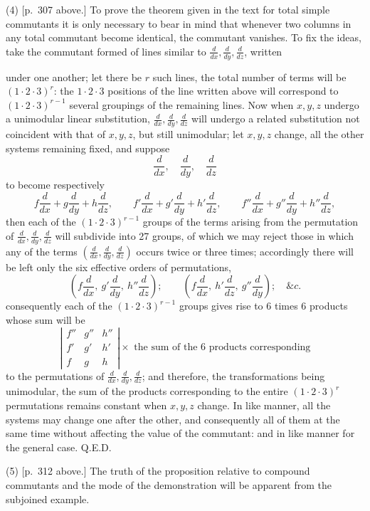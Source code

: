 \documentclass[11pt]{article}
\newcommand{\sourcepage}[1]{\marginpar{\scriptsize p.~#1}}
\begin{document}
(4) [p.~307 above.] To prove the theorem given in the text for total simple commutants it is only necessary to bear in mind that whenever two columns in any total commutant become identical, the commutant vanishes. To fix the ideas, take the commutant formed of lines similar to $\frac{d}{dx},\frac{d}{dy},\frac{d}{dz}$, written

\sourcepage{324}
under one another; let there be $r$ such lines, the total number of terms will be $(1\cdot2\cdot3)^r$: the $1\cdot2\cdot3$ positions of the line written above will correspond to $(1\cdot2\cdot3)^{r-1}$ several groupings of the remaining lines. Now when $x,y,z$ undergo a unimodular linear substitution, $\frac{d}{dx},\frac{d}{dy},\frac{d}{dz}$ will undergo a related substitution not coincident with that of $x,y,z$, but still unimodular; let $x,y,z$ change, all the other systems remaining fixed, and suppose
\[
\frac{d}{dx},\quad\frac{d}{dy},\quad\frac{d}{dz}
\]
to become respectively
\[
f\frac{d}{dx}+g\frac{d}{dy}+h\frac{d}{dz},\qquad
f'\frac{d}{dx}+g'\frac{d}{dy}+h'\frac{d}{dz},\qquad
f''\frac{d}{dx}+g''\frac{d}{dy}+h''\frac{d}{dz},
\]
then each of the $(1\cdot2\cdot3)^{r-1}$ groups of the terms arising from the permutation of $\frac{d}{dx},\frac{d}{dy},\frac{d}{dz}$ will subdivide into 27 groups, of which we may reject those in which any of the terms $\left(\frac{d}{dx},\frac{d}{dy},\frac{d}{dz}\right)$ occurs twice or three times; accordingly there will be left only the six effective orders of permutations,
\[
\left(f\frac{d}{dx},\ g'\frac{d}{dy},\ h''\frac{d}{dz}\right);\qquad
\left(f\frac{d}{dx},\ h'\frac{d}{dz},\ g''\frac{d}{dy}\right);\quad \&c.
\]
consequently each of the $(1\cdot2\cdot3)^{r-1}$ groups gives rise to 6 times 6 products whose sum will be
\[
\left|\begin{array}{ccc}
f''&g''&h''\\
f'&g'&h'\\
f&g&h
\end{array}\right|
\times \text{ the sum of the 6 products corresponding}
\]
to the permutations of $\frac{d}{dx},\frac{d}{dy},\frac{d}{dz}$; and therefore, the transformations being unimodular, the sum of the products corresponding to the entire $(1\cdot2\cdot3)^r$ permutations remains constant when $x,y,z$ change. In like manner, all the systems may change one after the other, and consequently all of them at the same time without affecting the value of the commutant: and in like manner for the general case. \hfill Q.E.D.

(5) [p.~312 above.] The truth of the proposition relative to compound commutants and the mode of the demonstration will be apparent from the subjoined example.
\end{document}

